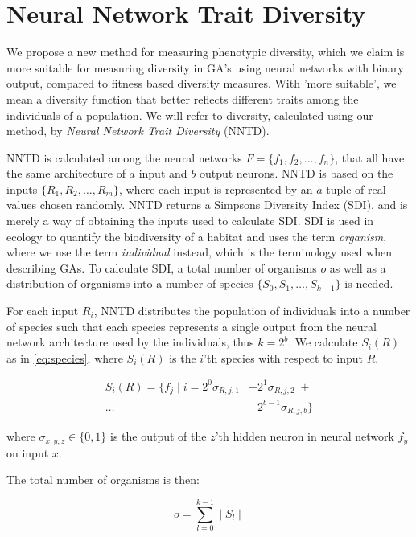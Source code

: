 \section{Neural Network Trait Diversity}
We propose a new method for measuring phenotypic diversity, which we claim is more suitable for measuring diversity in GA's using neural networks with binary output, compared to fitness based diversity measures. With 'more suitable', we mean a diversity function that better reflects different traits among the individuals of a population. We will refer to diversity, calculated using our method, by \emph{Neural Network Trait Diversity} (NNTD).

NNTD is calculated among the neural networks $F = \{f_1, f_2, \ldots, f_n\}$, that all have the same architecture of $a$ input and $b$ output neurons. NNTD is based on the inputs $\{R_1, R_2, \ldots, R_m\}$, where each input is represented by an $a$-tuple of real values chosen randomly. NNTD returns a Simpsons Diversity Index (SDI), and is merely a way of obtaining the inputs used to calculate SDI. SDI is used in ecology to quantify the biodiversity of a habitat and uses the term \emph{organism}, where we use the term \emph{individual} instead, which is the terminology used when describing GAs. To calculate SDI, a total number of organisms $o$ as well as a distribution of organisms into a number of species $\{S_0, S_1, \ldots, S_{k-1}\}$ is needed.

For each input $R_i$, NNTD distributes the population of individuals into a number of species such that each species represents a single output from the neural network architecture used by the individuals, thus $k = 2^b$. We calculate $S_i(R)$ as in \cref{eq:species}, where $S_i(R)$ is the $i$'th species with respect to input $R$.

\begin{equation}\label{eq:species}
  \begin{split}
    S_i(R) = \{f_j \mid i = 2^0\sigma_{R,j,1} & + 2^1\sigma_{R,j,2}\; + \\
  \ldots & + 2^{b-1}\sigma_{R,j,b} \}
  \end{split}
\end{equation}

where $\sigma_{x,y,z} \in \{0, 1\}$ is the output of the $z$'th hidden neuron in neural network $f_y$ on input $x$.

The total number of organisms is then:

\[o = \sum\limits_{l = 0}^{k-1} \mid S_l \mid\]

